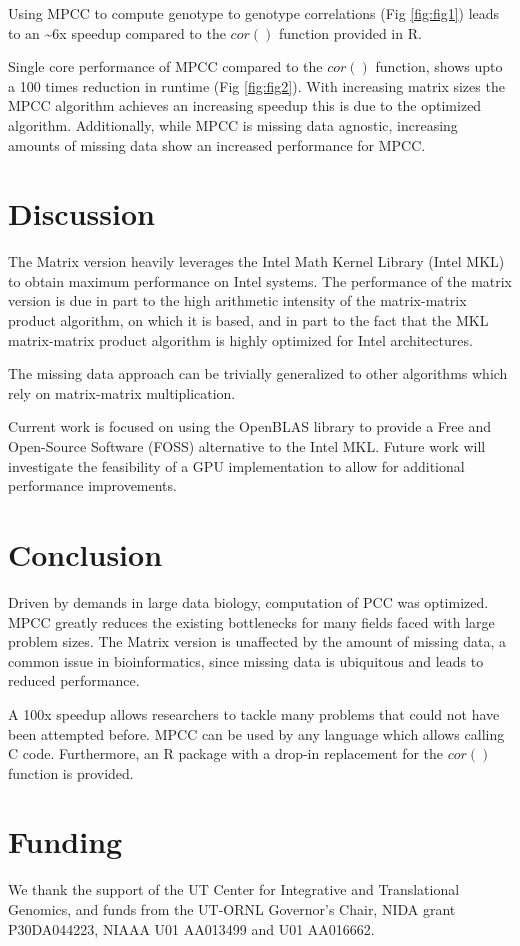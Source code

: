 \documentclass{bioinfo}
\begin{document}
Using MPCC to compute genotype to genotype correlations (Fig \ref{fig:fig1}) leads to 
an \textasciitilde{}6x speedup compared to the $cor()$ function provided in R.

Single core performance of MPCC compared to the $cor()$ function, shows upto a 
100 times reduction in runtime (Fig \ref{fig:fig2}). With increasing matrix sizes 
the MPCC algorithm achieves an increasing speedup this is due to the optimized 
algorithm. Additionally, while MPCC is missing data agnostic, increasing amounts 
of missing data show an increased performance for MPCC.
\vspace*{-5mm}
\section{Discussion}
The Matrix version heavily leverages the Intel\textregistered{} Math Kernel 
Library (Intel\textregistered{} MKL) to obtain maximum performance 
on Intel\textregistered{} systems. The performance of the 
matrix version is due in part to the high arithmetic intensity of the 
matrix-matrix product algorithm, on which it is based, and in 
part to the fact that the MKL matrix-matrix product algorithm is highly 
optimized for Intel architectures.  

The missing data approach can be trivially generalized to other 
algorithms which rely on matrix-matrix multiplication.

Current work is focused on using the OpenBLAS library to provide a Free 
and Open-Source Software (FOSS) alternative to the Intel\textregistered{} MKL. 
Future work will investigate the feasibility of a GPU implementation to allow 
for additional performance improvements.
\vspace*{-5mm}
\section{Conclusion}
Driven by demands in large data biology, computation of PCC was optimized. 
MPCC greatly reduces the existing bottlenecks for many fields faced with 
large problem sizes. The Matrix version is unaffected by the amount of 
missing data, a common issue in bioinformatics, since missing data is 
ubiquitous and leads to reduced performance.

A 100x speedup allows researchers to tackle many problems that could 
not have been attempted before. MPCC can be used by any language which 
allows calling C code. Furthermore, an R package with a drop-in 
replacement for the $cor()$ function is provided.
\vspace*{-5mm}
\section*{Funding}
We thank the support of the UT Center for Integrative and Translational Genomics, 
and funds from the UT-ORNL Governor's Chair, NIDA grant P30DA044223, NIAAA U01 
AA013499 and U01 AA016662.
\vspace*{-5mm}


\end{document}
